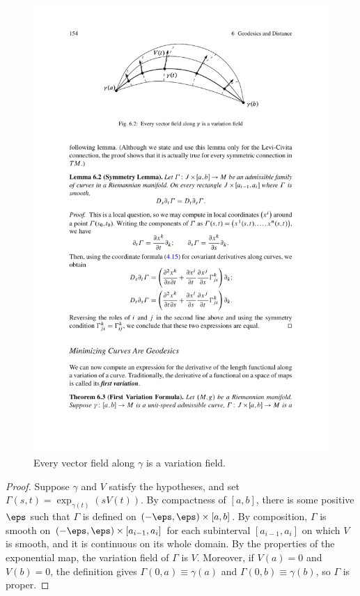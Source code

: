 \begin{figure}[htbp]
\centering
\includegraphics{pictures/variation-field}
\caption{Every vector field along $\gamma$ is a variation field.}
\end{figure}
\begin{proof}
Suppose $\gamma$ and $V$ satisfy the hypotheses, and set $\Gamma(s,t)=\exp_{\gamma(t)}(sV(t))$. By compactness of $[a,b]$, there is some positive $\eps$ such that $\Gamma$ 
is defined on $(-\eps,\eps)\times[a,b]$. By composition, $\Gamma$ is smooth on $(-\eps,\eps)\times[a_{i-1},a_i]$ for each subinterval $[a_{i-1},a_i]$ on which $V$ is 
smooth, and it is continuous on its whole domain. By the properties of the exponential map, the variation field of $\Gamma$ is $V$. Moreover, if $V(a)=0$ and $V(b)=0$, 
the definition gives $\Gamma(0,a)\equiv\gamma(a)$ and $\Gamma(0,b)\equiv\gamma(b)$, so $\Gamma$ is proper.
\end{proof}
